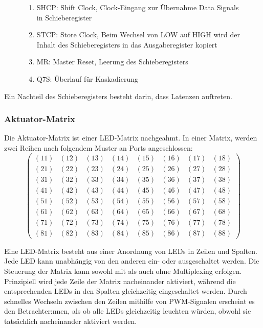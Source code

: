\begin{figure}[htbp]
\begin{minipage}{0.55\textwidth}
\begin{enumerate}
		\item SHCP: Shift Clock, Clock-Eingang zur Übernahme Data Signals in Schieberegister
		\item STCP: Store Clock, Beim Wechsel von LOW auf HIGH wird der Inhalt des Schieberegisters in das Ausgaberegister kopiert
		\item MR: Master Reset, Leerung des Schieberegisters
		\item Q7S: Überlauf für Kaskadierung
	\end{enumerate}
\end{minipage}
\end{figure}
Ein Nachteil des Schieberegisters besteht darin, dass Latenzen auftreten.
\subsubsection{Aktuator-Matrix\cite*[siehe ][]{LEDMatrix}}
Die Aktuator-Matrix ist einer LED-Matrix nachgeahmt.
In einer Matrix, werden zwei Reihen nach folgendem Muster an Ports angeschlossen:
$$
\begin{pmatrix}
	(11) & (12) & (13) & (14) & (15) & (16) & (17) & (18) \\
	(21) & (22) & (23) & (24) & (25) & (26) & (27) & (28) \\
	(31) & (32) & (33) & (34) & (35) & (36) & (37) & (38) \\
	(41) & (42) & (43) & (44) & (45) & (46) & (47) & (48) \\
	(51) & (52) & (53) & (54) & (55) & (56) & (57) & (58) \\
	(61) & (62) & (63) & (64) & (65) & (66) & (67) & (68) \\
	(71) & (72) & (73) & (74) & (75) & (76) & (77) & (78) \\
	(81) & (82) & (83) & (84) & (85) & (86) & (87) & (88)
\end{pmatrix}
$$

Eine LED-Matrix besteht aus einer Anordnung von LEDs in Zeilen und Spalten.
Jede LED kann unabhängig von den anderen ein- oder ausgeschaltet werden.
Die Steuerung der Matrix kann sowohl mit als auch ohne Multiplexing erfolgen.
Prinzipiell wird jede Zeile der Matrix nacheinander aktiviert, während die
entsprechenden LEDs in den Spalten gleichzeitig eingeschaltet werden.
Durch schnelles Wechseln zwischen den Zeilen mithilfe von \ac{PWM}-Signalen erscheint es den Betrachter:nnen, als ob alle LEDs
gleichzeitig leuchten würden, obwohl sie tatsächlich nacheinander aktiviert werden.

